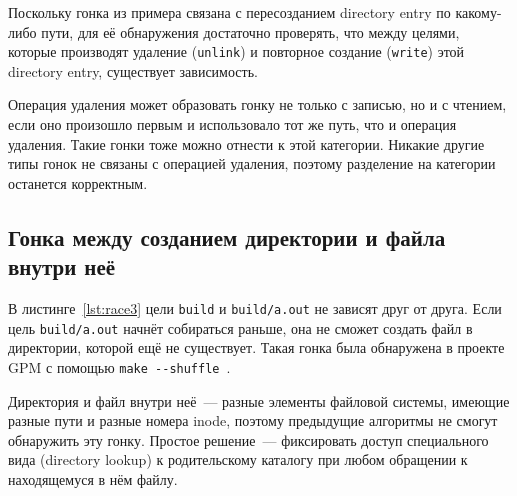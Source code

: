 Поскольку гонка из примера связана с пересозданием directory entry по какому-либо пути, для её обнаружения достаточно проверять, что между целями, которые производят удаление (\texttt{unlink}) и повторное создание (\texttt{write}) этой directory entry, существует зависимость.

Операция удаления может образовать гонку не только с записью, но и с чтением, если оно произошло первым и использовало тот же путь, что и операция удаления. Такие гонки тоже можно отнести к этой категории. Никакие другие типы гонок не связаны с операцией удаления, поэтому разделение на категории останется корректным.

\subsection{Гонка между созданием директории и файла внутри неё}
\label{subsec:dir-race}



В листинге~\ref{lst:race3} цели \texttt{build} и \texttt{build/a.out} не зависят друг от друга. Если цель \texttt{build/a.out} начнёт собираться раньше, она не сможет создать файл в директории, которой ещё не существует. Такая гонка была обнаружена в проекте GPM с помощью \texttt{make -{}-shuffle}~\cite{race-3-example}.

Директория и файл внутри неё~--- разные элементы файловой системы, имеющие разные пути и разные номера inode, поэтому предыдущие алгоритмы не смогут обнаружить эту гонку. Простое решение~--- фиксировать доступ специального вида (directory lookup) к родительскому каталогу при любом обращении к находящемуся в нём файлу.

